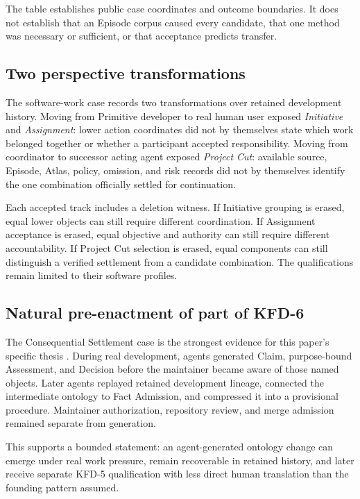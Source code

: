 The table establishes public case coordinates and outcome boundaries. It does
not establish that an Episode corpus caused every candidate, that one method
was necessary or sufficient, or that acceptance predicts transfer.

\subsection{Two perspective transformations}

The software-work case records two transformations over retained development
history. Moving from Primitive developer to real human user exposed
\emph{Initiative} and \emph{Assignment}: lower action coordinates did not by
themselves state which work belonged together or whether a participant
accepted responsibility. Moving from coordinator to successor acting agent
exposed \emph{Project Cut}: available source, Episode, Atlas, policy, omission,
and risk records did not by themselves identify the one combination officially
settled for continuation.

Each accepted track includes a deletion witness. If Initiative grouping is
erased, equal lower objects can still require different coordination. If
Assignment acceptance is erased, equal objective and authority can still
require different accountability. If Project Cut selection is erased, equal
components can still distinguish a verified settlement from a candidate
combination. The qualifications remain limited to their software profiles.

\subsection{Natural pre-enactment of part of KFD-6}

The Consequential Settlement case is the strongest evidence for this paper's
specific thesis \cite{kfdConsequential2026}. During real development, agents
generated Claim, purpose-bound Assessment, and Decision before the maintainer
became aware of those named objects. Later agents replayed retained development
lineage, connected the intermediate ontology to Fact Admission, and compressed
it into a provisional procedure. Maintainer authorization, repository review,
and merge admission remained separate from generation.

This supports a bounded statement: an agent-generated ontology change can
emerge under real work pressure, remain recoverable in retained history, and
later receive separate KFD-5 qualification with less direct human translation
than the founding pattern assumed.

